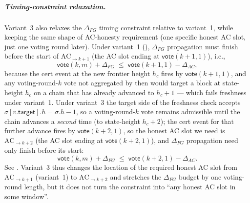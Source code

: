 \ifx\litemode\undefined\documentclass{article}\fi
\newcommand{\target}{\mathsf{target}}
\newcommand{\vote}{\ensuremath{\mathsf{vote}}}
\theoremstyle{plain}
\theoremstyle{definition}
\theoremstyle{remark}
\begin{document}
\subparagraph{Timing-constraint relaxation.}
Variant~3 also relaxes the $\Delta_{\mathit{FG}}$ timing constraint relative to variant~1, while keeping the same shape of AC-honesty requirement (one specific honest AC slot, just one voting round later).
Under variant~1 (), $\Delta_{\mathit{FG}}$ propagation must finish before the start of $\mathrm{AC}_{\to k+1}$ (the AC slot ending at $\vote(k{+}1, 1)$), i.e.,
\[
  \vote(k, m) + \Delta_{\mathit{FG}} \;\leq\; \vote(k{+}1, 1) - \Delta_{\mathit{AC}},
\]
because the cert event at the new frontier height $h_c$ fires by $\vote(k{+}1, 1)$, and any voting-round-$k$ vote not aggregated by then would target a block at state-height $h_c$ on a chain that has already advanced to $h_c + 1$ --- which fails freshness under variant~1.
Under variant~3 the target side of the freshness check accepts $\sigma[v.\target].h = \sigma.h - 1$, so a voting-round-$k$ vote remains admissible until the chain advances a \emph{second} time (to state-height $h_c + 2$); the cert event for that further advance fires by $\vote(k{+}2, 1)$, so the honest AC slot we need is $\mathrm{AC}_{\to k+2}$ (the AC slot ending at $\vote(k{+}2, 1)$), and $\Delta_{\mathit{FG}}$ propagation need only finish before its start:
\[
  \vote(k, m) + \Delta_{\mathit{FG}} \;\leq\; \vote(k{+}2, 1) - \Delta_{\mathit{AC}}.
\]
See . Variant~3 thus changes the location of the required honest AC slot from $\mathrm{AC}_{\to k+1}$ (variant~1) to $\mathrm{AC}_{\to k+2}$ and stretches the $\Delta_{\mathit{FG}}$ budget by one voting-round length, but it does not turn the constraint into ``any honest AC slot in some window''.
\end{document}
